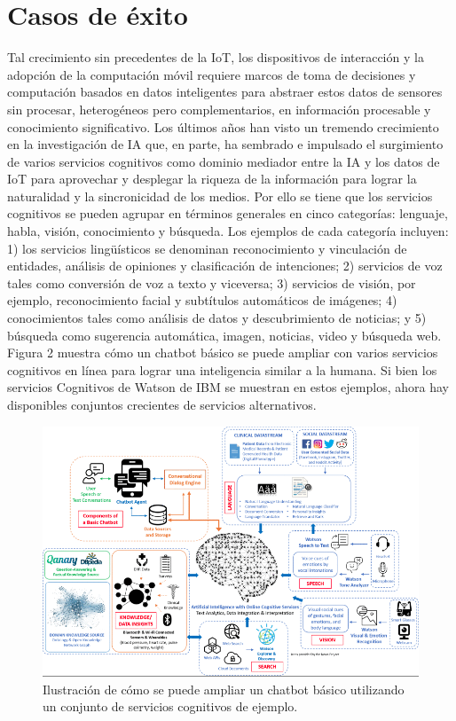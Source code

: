 \section{Casos de éxito}
Tal crecimiento sin precedentes de la IoT, los dispositivos de interacción y la adopción de la computación móvil requiere marcos de toma de decisiones y computación basados en datos inteligentes para abstraer estos datos de sensores sin procesar, heterogéneos pero complementarios, en información procesable y conocimiento significativo. Los últimos años han visto un tremendo crecimiento en la investigación de IA que, en parte, ha sembrado e impulsado el surgimiento de varios servicios cognitivos como dominio mediador entre la IA y los datos de IoT para aprovechar y desplegar la riqueza de la información para lograr la naturalidad y la sincronicidad de los medios.
Por ello se tiene que los servicios cognitivos se pueden agrupar en términos generales en cinco categorías: lenguaje, habla, visión, conocimiento y búsqueda. Los ejemplos de cada categoría incluyen: 1) los servicios lingüísticos se denominan reconocimiento y vinculación de entidades, análisis de opiniones y clasificación de intenciones; 2) servicios de voz tales como conversión de voz a texto y viceversa; 3) servicios de visión, por ejemplo, reconocimiento facial y subtítulos automáticos de imágenes; 4) conocimientos tales como análisis de datos y descubrimiento de noticias; y 5) búsqueda como sugerencia automática, imagen, noticias, video y búsqueda web.  Figura 2 muestra
 cómo un chatbot básico se puede ampliar con varios servicios cognitivos en línea para lograr una inteligencia similar a la humana. Si bien los servicios Cognitivos de Watson de IBM se muestran en estos ejemplos, ahora hay disponibles conjuntos crecientes de servicios alternativos.

\begin{figure}[htbp]
\centerline{\includegraphics[width = 0.5 \textwidth]{fig02.png}}
\caption{Ilustración de cómo se puede ampliar un chatbot básico utilizando un conjunto de servicios cognitivos de ejemplo.}
\label{fig2}
\end{figure}
{\color{red}}

